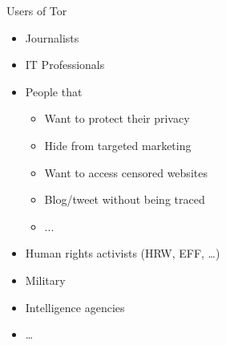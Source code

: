 \documentclass{beamer}
\begin{document}
\begin{frame}{Users of Tor}
	\begin{itemize}
		\item Journalists
		\item IT Professionals
		\item People that
			\begin{itemize}
				\item Want to protect their privacy
				\item Hide from targeted marketing
				\item Want to access censored websites
				\item Blog/tweet without being traced
				\item ...
			\end{itemize}
		\item Human rights activists (HRW, EFF, \ldots)
		\item Military
		\item Intelligence agencies
		\item \ldots
	\end{itemize}
\end{frame}
\end{document}
